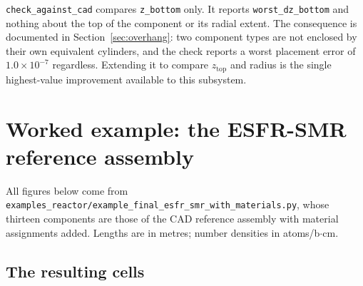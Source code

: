 \documentclass[9pt,a4paper]{extarticle}
\newcommand{\code}[1]{\texttt{\small #1}}
\newcommand{\file}[1]{\texttt{\small #1}}
\begin{document}
\code{check\_against\_cad} compares \code{z\_bottom} only. It reports
\code{worst\_dz\_bottom} and nothing about the top of the component or its
radial extent. The consequence is documented in Section~\ref{sec:overhang}: two
component types are not enclosed by their own equivalent cylinders, and the
check reports a worst placement error of $1.0\times10^{-7}$ regardless.
Extending it to compare $z_{\mathrm{top}}$ and radius is the single highest-value
improvement available to this subsystem.

\section{Worked example: the ESFR-SMR reference assembly}

All figures below come from
\file{examples\_reactor/example\_final\_esfr\_smr\_with\_materials.py}, whose
thirteen components are those of the CAD reference assembly with material
assignments added. Lengths are in metres; number densities in
atoms/b$\cdot$cm.

\subsection{The resulting cells}
\end{document}
